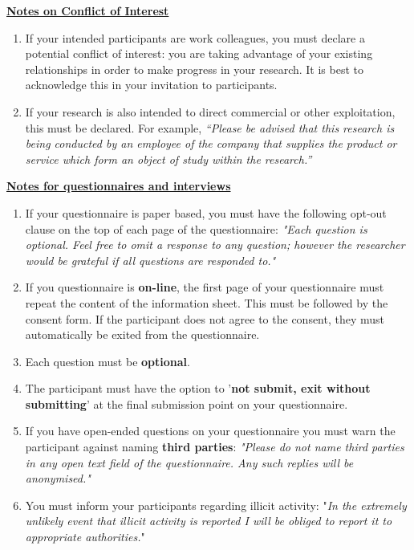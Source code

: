 \underline{\textbf{Notes on Conflict of Interest}}
\begin{enumerate}
    \item If  your intended participants are work colleagues,  you must declare a potential conflict of interest: you are taking advantage of your existing relationships in order to make progress in your research.  It is best to acknowledge this in your invitation to participants.
    \item If your research is also intended to direct commercial or other exploitation, this must be declared. For example, \textit{“Please be advised that this research is being conducted by an employee of the company that supplies the product or service which form an object of study within the research.”}
\end{enumerate}

\underline{\textbf{Notes for questionnaires and interviews}}
\begin{enumerate}
    \item If your questionnaire is paper based, you must have the following opt-out clause on the top of each page of the questionnaire: \textit{"Each question is optional. Feel free to omit a response to any question; however the researcher would be grateful if all questions are responded to."}
    \item If you questionnaire is \textbf{on-line}, the first page of your questionnaire must repeat the content of the information sheet. This must be followed by the consent form. If the participant does not agree to the consent, they must automatically be exited from the questionnaire.
    \item Each question must be \textbf{optional}.
    \item The participant must have the option to '\textbf{not submit, exit without submitting}' at the final submission point on your questionnaire.
    \item If you have open-ended questions on your questionnaire you must warn the participant against naming \textbf{third parties}: \textit{"Please do not name third parties in any open text field of the questionnaire. Any such replies will be anonymised."}
    \item You must inform your participants regarding illicit activity: "\textit{In the extremely unlikely event that illicit activity is reported I will be obliged to report it to appropriate authorities.}" 
\end{enumerate}
